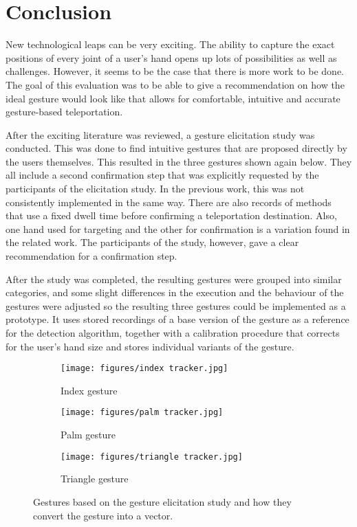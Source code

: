 \chapter{Conclusion}

New technological leaps can be very exciting. The ability to capture the exact positions of every joint of a user's hand opens up lots of possibilities as well as challenges. However, it seems to be the case that there is more work to be done. The goal of this evaluation was to be able to give a recommendation on how the ideal gesture would look like that allows for comfortable, intuitive and accurate gesture-based teleportation. 

After the exciting literature was reviewed, a gesture elicitation study was conducted. This was done to find intuitive gestures that are proposed directly by the users themselves. This resulted in the three gestures shown again below. They all include a second confirmation step that was explicitly requested by the participants of the elicitation study. In the previous work, this was not consistently implemented in the same way. There are also records of methods that use a fixed dwell time before confirming a teleportation destination. Also, one hand used for targeting and the other for confirmation is a variation found in the related work. The participants of the study, however, gave a clear recommendation for a confirmation step. 

After the study was completed, the resulting gestures were grouped into similar categories, and some slight differences in the execution and the behaviour of the gestures were adjusted so the resulting three gestures could be implemented as a prototype. It uses stored recordings of a base version of the gesture as a reference for the detection algorithm, together with a calibration procedure that corrects for the user's hand size and stores individual variants of the gesture.

\begin{figure}[!h]
    \begin{subfigure}{0.32\textwidth}
  \centering
        \texttt{[image: figures/index tracker.jpg]}
        \caption{Index gesture}
    \end{subfigure}%
    \begin{subfigure}{0.32\textwidth}
  \centering
        \texttt{[image: figures/palm tracker.jpg]}
        \caption{Palm gesture}
    \end{subfigure}%
    \begin{subfigure}{0.32\textwidth}
  \centering
        \texttt{[image: figures/triangle tracker.jpg]}
        \caption{Triangle gesture}
    \end{subfigure}%
    \hfill
    \caption{Gestures based on the gesture elicitation study and how they convert the gesture into a vector.}
\end{figure}

